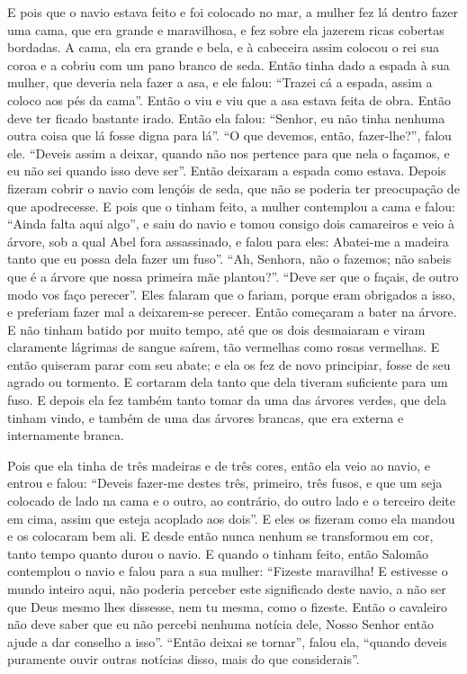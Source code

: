 E pois que o navio estava feito e foi colocado no mar, a mulher fez lá dentro
fazer uma cama, que era grande e maravilhosa, e fez sobre ela jazerem ricas
cobertas bordadas. A cama, ela era grande e bela, e à cabeceira assim colocou o
rei sua coroa e a cobriu com um pano branco de seda. Então tinha dado a espada
à sua mulher, que deveria nela fazer a asa, e ele falou: “Trazei cá a espada,
assim a coloco aos pés da cama”. Então o viu e viu que a asa estava feita de
obra. Então deve ter ficado bastante irado. Então ela falou: “Senhor, eu não
tinha nenhuma outra coisa que lá fosse digna para lá”. “O que devemos, então,
fazer-lhe?”, falou ele. “Deveis assim a deixar, quando não nos pertence para
que nela o façamos, e eu não sei quando isso deve ser”. Então deixaram a espada
como estava. Depois fizeram cobrir o navio com lençóis de seda, que não se
poderia ter preocupação de que apodrecesse. E pois que o tinham feito, a mulher
contemplou a cama e falou: “Ainda falta aqui algo”, e saiu do navio e tomou
consigo dois camareiros e veio à árvore, sob a qual Abel fora assassinado, e
falou para eles: Abatei-me a madeira tanto que eu possa dela fazer um fuso”.
“Ah, Senhora, não o fazemos; não sabeis que é a árvore que nossa primeira mãe
plantou?”. “Deve ser que o façais, de outro modo vos faço perecer”. Eles
falaram que o fariam, porque eram obrigados a isso, e preferiam fazer mal a
deixarem-se perecer. Então começaram a bater na árvore. E não tinham batido por
muito tempo, até que os dois desmaiaram e viram claramente lágrimas de sangue
saírem, tão vermelhas como rosas vermelhas. E então quiseram parar com seu
abate; e ela os fez de novo principiar, fosse de seu agrado ou tormento. E
cortaram dela tanto que dela tiveram suficiente para um fuso. E depois ela fez
também tanto tomar da uma das árvores verdes, que dela tinham vindo, e também
de uma das árvores brancas, que era externa e internamente branca.

Pois que ela tinha de três madeiras e de três cores, então ela veio ao navio, e
entrou e falou: “Deveis fazer-me destes três, primeiro, três fusos, e que um
seja colocado de lado na cama e o outro, ao contrário, do outro lado e o
terceiro deite em cima, assim que esteja acoplado aos dois”. E eles os fizeram
como ela mandou e os colocaram bem ali. E desde então nunca nenhum se
transformou em cor, tanto tempo quanto durou o navio. E quando o tinham feito,
então Salomão contemplou o navio e falou para a sua mulher: “Fizeste maravilha!
E estivesse o mundo inteiro aqui, não poderia perceber este significado deste
navio, a não ser que Deus mesmo lhes dissesse, nem tu mesma, como o fizeste.
Então o cavaleiro não deve saber que eu não percebi nenhuma notícia dele, Nosso
Senhor então ajude a dar conselho a isso”. “Então deixai se tornar”, falou ela,
“quando deveis puramente ouvir outras notícias disso, mais do que considerais”.


